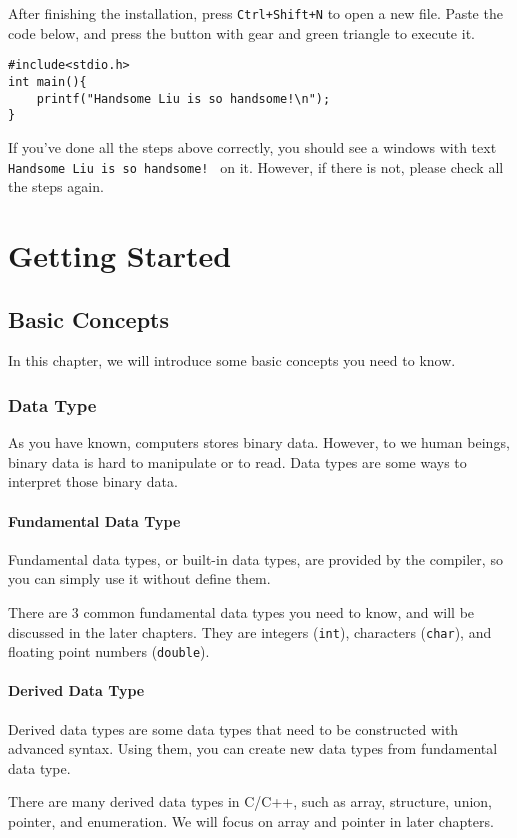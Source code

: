 \documentclass{report}
\begin{document}
    After finishing the installation, press \texttt{Ctrl+Shift+N} to open a new file. Paste the code below, and press the button with gear and green triangle to execute it.

\begin{lstlisting}[style=CStyle]
#include<stdio.h>
int main(){
    printf("Handsome Liu is so handsome!\n");
}
\end{lstlisting}

    If you've done all the steps above correctly, you should see a windows with text \texttt{ Handsome Liu is so handsome! } on it. However, if there is not, please check all the steps again.

\part{Getting Started}
\chapter{Basic Concepts}
    In this chapter, we will introduce some basic concepts you need to know.
\section{Data Type}
    As you have known, computers stores binary data. However, to we human beings, binary data is hard to manipulate or to read. Data types are some ways to interpret those binary data.
   
    \subsection{Fundamental Data Type}
    Fundamental data types, or built-in data types, are provided by the compiler, so you can simply use it without define them.

    There are 3 common fundamental data types you need to know, and will be discussed in the later chapters. They are integers (\texttt{int}), characters (\texttt{char}), and floating point numbers (\texttt{double}).

    \subsection{Derived Data Type}
    Derived data types are some data types that need to be constructed with advanced syntax. Using them, you can create new data types from fundamental data type.

    There are many derived data types in C/C++, such as array, structure, union, pointer, and enumeration. We will focus on array and pointer in later chapters.
\end{document}

